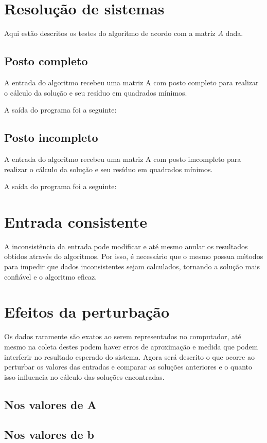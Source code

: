 \chapter{Resolução de sistemas}
Aqui estão descritos os testes do algoritmo de acordo com a matriz $A$ dada.

\section{Posto completo}
A entrada do algoritmo recebeu uma matriz A com posto completo para realizar
o cálculo da solução e seu resíduo em quadrados mínimos.

A saída do programa foi a seguinte:
\section{Posto incompleto}

A entrada do algoritmo recebeu uma matriz A com posto imcompleto para realizar
o cálculo da solução e seu resíduo em quadrados mínimos.

A saída do programa foi a seguinte:

\chapter{Entrada consistente}
A inconsistência da entrada pode modificar e até mesmo anular os resultados
obtidos através do algoritmos. Por isso, é necessário que o mesmo possua 
métodos para impedir que dados inconsistentes sejam calculados, tornando
a solução mais confiável e o algoritmo eficaz.

\chapter{Efeitos da perturbação}
Os dados raramente são exatos ao serem representados no computador, até mesmo na 
coleta destes podem haver erros de aproximação e medida que podem interferir no
resultado esperado do sistema.
Agora será descrito o que ocorre ao perturbar os valores das entradas e 
comparar as soluções anteriores e o quanto isso influencia no cálculo das 
soluções encontradas.


\section{Nos valores de A}

\section{Nos valores de b}

